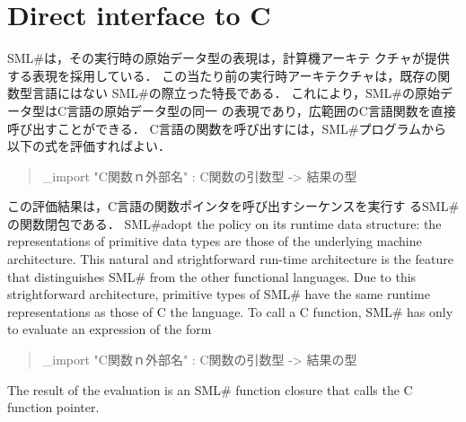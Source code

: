 \documentclass{jbook}
\newcommand{\txt}[2]{#2}
\newcommand{\smlsharp}{SML\#}
\newenvironment{program}{\begin{quote}\begin{tt}}%
                        {\end{tt}\end{quote}}
\begin{document}
\section{\txt{Ｃとの連携機能}{Direct interface to C}}
\ifjp%
	\smlsharp{}は，その実行時の原始データ型の表現は，計算機アーキテ
クチャが提供する表現を採用している．
	この当たり前の実行時アーキテクチャは，既存の関数型言語にはない
\smlsharp{}の際立った特長である．
	これにより，\smlsharp{}の原始データ型はC言語の原始データ型の同一
の表現であり，広範囲のC言語関数を直接呼び出すことができる．
	C言語の関数を呼び出すには，\smlsharp{}プログラムから
以下の式を評価すればよい．
\begin{program}
\_import "C関数ｎ外部名" : C関数の引数型 -> 結果の型
\end{program}
	この評価結果は，C言語の関数ポインタを呼び出すシーケンスを実行す
る\smlsharp{}の関数閉包である．
\else%
	\smlsharp{}adopt the policy on its runtime data
structure: the representations of primitive data types are those of the
underlying machine architecture.
	This natural and strightforward run-time architecture is the
feature that distinguishes \smlsharp{} from the other functional
languages.
	Due to this strightforward architecture, primitive types of
\smlsharp{} have the same runtime representations as those of C
the language.
	To call a C function, \smlsharp{} has only to evaluate an
expression of the form
\begin{program}
\_import "C関数ｎ外部名" : C関数の引数型 -> 結果の型
\end{program}
	The result of the evaluation is an \smlsharp{} function closure
that calls the C function pointer.
\fi%
\end{document}
